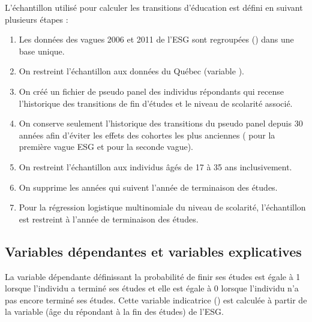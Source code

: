 \documentclass[letterpaper,10pt,french]{sphinxmanual}
\begin{document}
L’échantillon utilisé pour calculer les transitions d’éducation est défini en suivant plusieurs étapes :
\begin{enumerate}
%
\item {} 
Les données des vagues 2006 et 2011 de l’ESG sont regroupées () dans une base unique.

\item {} 
On restreint l’échantillon aux données du Québec (variable ).

\item {} 
On créé un fichier de pseudo panel des individus répondants qui recense l’historique des transitions de fin d’études et le niveau de scolarité associé.

\item {} 
On conserve seulement l’historique des transitions du pseudo panel depuis 30 années afin d’éviter les effets des cohortes les plus anciennes ( pour la première vague ESG et  pour la seconde vague).

\item {} 
On restreint l’échantillon aux individus âgés de 17 à 35 ans inclusivement.

\item {} 
On supprime les années qui suivent l’année de terminaison des études.

\item {} 
Pour la régression logistique multinomiale du niveau de scolarité, l’échantillon est restreint à l’année de terminaison des études.

\end{enumerate}


\subsection{Variables dépendantes et variables explicatives}
\label{\detokenize{transition_models:id4}}
La variable dépendante  définissant la probabilité de finir ses études est égale à 1 lorsque l’individu a terminé ses études et elle est égale à 0 lorsque l’individu n’a pas encore terminé ses études. Cette variable indicatrice () est calculée à partir de la variable  (âge du répondant à la fin des études) de l’ESG.
\end{document}
